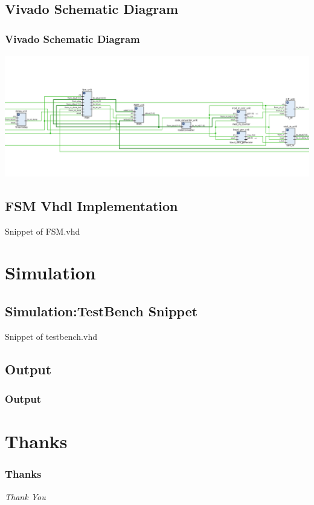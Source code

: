 \documentclass{beamer}
\begin{document}
\subsection{Vivado Schematic Diagram}
\begin{frame}
\frametitle{Vivado Schematic Diagram}
\includegraphics[width=\textwidth, height=0.8\textheight] {../diagram/schematic_diagram.png}
\end{frame}

\subsection{FSM Vhdl Implementation}
\begin{large}
Snippet of FSM.vhd
\end{large}
\begin{tiny}

\end{tiny}

\break

\section{Simulation}
\subsection{Simulation:TestBench Snippet}
\begin{large}
Snippet of testbench.vhd
\end{large}
\begin{tiny}

\end{tiny}

\break

\subsection{Output}
\begin{frame}
\frametitle{Output}
\end{frame}

\section{Thanks}
\begin{frame}
\frametitle{Thanks}
\centering \Huge
  \emph{Thank You}
\end{frame}
\end{document}
